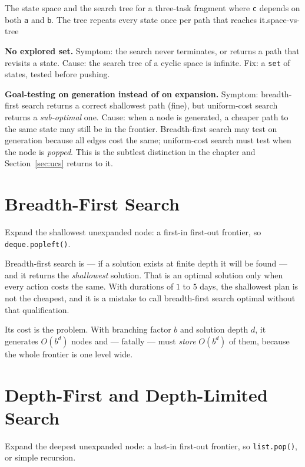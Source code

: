 {The state space and the search tree for a three-task fragment where \texttt{c}
depends on both \texttt{a} and \texttt{b}. The tree repeats every state once per
path that reaches it.}{space-vs-tree}

\begin{alertbox}
\textbf{No explored set.} Symptom: the search never terminates, or returns a path
that revisits a state. Cause: the search tree of a cyclic space is infinite. Fix:
a \texttt{set} of states, tested before pushing.

\smallskip
\textbf{Goal-testing on generation instead of on expansion.} Symptom: breadth-first
search returns a correct shallowest path (fine), but uniform-cost search returns a
\emph{sub-optimal} one. Cause: when a node is generated, a cheaper path to the same
state may still be in the frontier. Breadth-first search may test on generation
because all edges cost the same; uniform-cost search must test when the node is
\emph{popped}. This is the subtlest distinction in the chapter and
Section~\ref{sec:ucs} returns to it.
\end{alertbox}

\section{Breadth-First Search}

Expand the shallowest unexpanded node: a first-in first-out frontier, so
\texttt{deque.popleft()}.

Breadth-first search is  --- if a solution exists at finite depth it
will be found --- and it returns the \emph{shallowest} solution. That is an optimal
solution only when every action costs the same. With durations of $1$ to $5$ days,
the shallowest plan is not the cheapest, and it is a mistake to call breadth-first
search optimal without that qualification.

Its cost is the problem. With branching factor $b$ and solution depth $d$, it
generates $O(b^{d})$ nodes and --- fatally --- must \emph{store} $O(b^{d})$ of them,
because the whole frontier is one level wide.

\section{Depth-First and Depth-Limited Search}

Expand the deepest unexpanded node: a last-in first-out frontier, so
\texttt{list.pop()}, or simple recursion.

